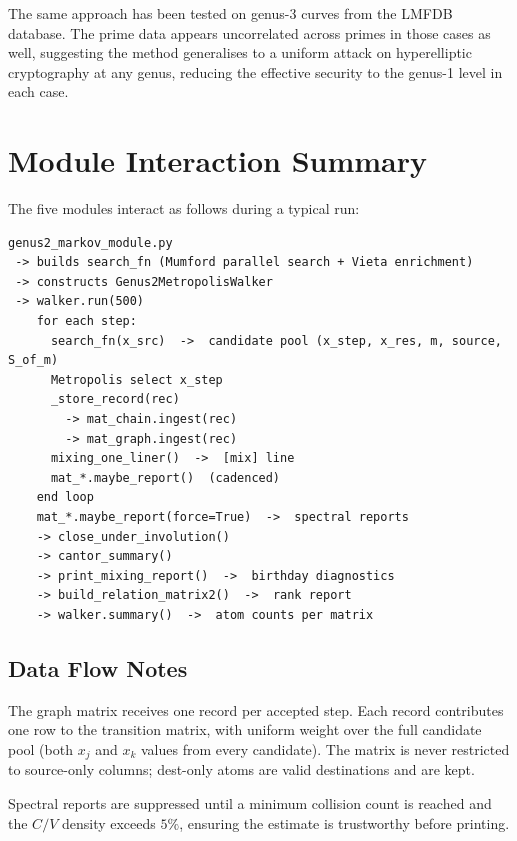 \documentclass[11pt]{article}
\theoremstyle{definition}
\theoremstyle{remark}
\begin{document}
The same approach has been tested on genus-3 curves from the LMFDB database.
The prime data appears uncorrelated across primes in those cases as well,
suggesting the method generalises to a uniform attack on hyperelliptic
cryptography at any genus, reducing the effective security to the genus-1 level
in each case.

\section{Module Interaction Summary}
\label{sec:interaction}

The five modules interact as follows during a typical run:

\begin{verbatim}
genus2_markov_module.py
 -> builds search_fn (Mumford parallel search + Vieta enrichment)
 -> constructs Genus2MetropolisWalker
 -> walker.run(500)
    for each step:
      search_fn(x_src)  ->  candidate pool (x_step, x_res, m, source, S_of_m)
      Metropolis select x_step
      _store_record(rec)
        -> mat_chain.ingest(rec)
        -> mat_graph.ingest(rec)
      mixing_one_liner()  ->  [mix] line
      mat_*.maybe_report()  (cadenced)
    end loop
    mat_*.maybe_report(force=True)  ->  spectral reports
    -> close_under_involution()
    -> cantor_summary()
    -> print_mixing_report()  ->  birthday diagnostics
    -> build_relation_matrix2()  ->  rank report
    -> walker.summary()  ->  atom counts per matrix
\end{verbatim}

\subsection{Data Flow Notes}

The graph matrix receives one record per accepted step. Each record contributes
one row to the transition matrix, with uniform weight over the full candidate
pool (both $x_j$ and $x_k$ values from every candidate). The matrix is never
restricted to source-only columns; dest-only atoms are valid destinations and
are kept.

Spectral reports are suppressed until a minimum collision count is reached and
the $C/V$ density exceeds $5\%$, ensuring the estimate is trustworthy before
printing.

\end{document}
